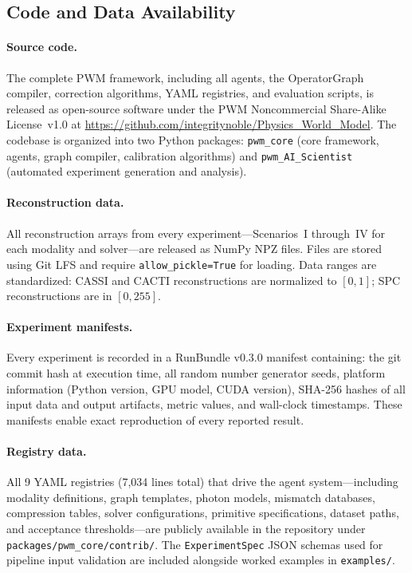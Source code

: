 \subsection*{Code and Data Availability}
\label{sec:methods:availability}

\paragraph{Source code.}
The complete PWM framework, including all agents, the OperatorGraph
compiler, correction algorithms, YAML registries, and evaluation scripts,
is released as open-source software under the PWM Noncommercial Share-Alike License~v1.0 at
\url{https://github.com/integritynoble/Physics_World_Model}.  The
codebase is organized into two Python packages:
\texttt{pwm\_core} (core framework, agents, graph compiler, calibration
algorithms) and \texttt{pwm\_AI\_Scientist} (automated experiment
generation and analysis).

\paragraph{Reconstruction data.}
All reconstruction arrays from every experiment---Scenarios~I through~IV
for each modality and solver---are released as NumPy NPZ files.
Files are stored using Git LFS and require \texttt{allow\_pickle=True}
for loading.  Data ranges are standardized: CASSI and CACTI
reconstructions are normalized to $[0, 1]$; SPC reconstructions are in
$[0, 255]$.

\paragraph{Experiment manifests.}
Every experiment is recorded in a RunBundle v0.3.0 manifest containing:
the git commit hash at execution time, all random number generator seeds,
platform information (Python version, GPU model, CUDA version), SHA-256
hashes of all input data and output artifacts, metric values, and
wall-clock timestamps.  These manifests enable exact reproduction of every
reported result.

\paragraph{Registry data.}
All 9 YAML registries (7,034 lines total) that drive the agent system---including
modality definitions, graph templates, photon models, mismatch databases,
compression tables, solver configurations, primitive specifications,
dataset paths, and acceptance thresholds---are publicly available in the
repository under \texttt{packages/pwm\_core/contrib/}.
The \texttt{ExperimentSpec} JSON schemas used for pipeline input
validation are included alongside worked examples in
\texttt{examples/}.
